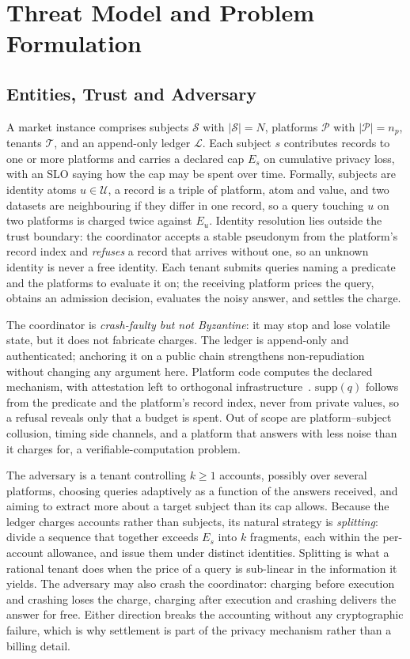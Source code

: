 \section{Threat Model and Problem Formulation}
\label{sec:model}

\subsection{Entities, Trust and Adversary}

A market instance comprises subjects $\mathcal{S}$ with $|\mathcal{S}|=N$,
platforms $\mathcal{P}$ with $|\mathcal{P}|=n_p$, tenants $\mathcal{T}$, and an
append-only ledger $\mathcal{L}$. Each subject $s$ contributes records to one or more platforms and carries a
declared cap $E_s$ on cumulative privacy loss, with an SLO saying how the cap may
be spent over time. Formally, subjects are identity atoms $u\in\mathcal{U}$, a record is
a triple of platform, atom and value, and two datasets are neighbouring if they differ in
one record, so a query touching $u$ on two platforms is charged twice against $E_u$.
Identity resolution lies outside the trust boundary: the coordinator accepts a stable
pseudonym from the platform's record index and \emph{refuses} a record that arrives
without one, so an unknown identity is never a free identity. Each tenant submits queries naming a predicate and the
platforms to evaluate it on; the receiving platform prices the query, obtains an
admission decision, evaluates the noisy answer, and settles the charge.

The coordinator is \emph{crash-faulty but not Byzantine}: it may stop and lose volatile
state, but it does not fabricate charges. The ledger is append-only and authenticated;
anchoring it on a public chain strengthens non-repudiation without changing any
argument here. Platform code computes the declared mechanism, with attestation left to
orthogonal infrastructure~\cite{liu2025yotta,zhu2025auditing}. $\mathrm{supp}(q)$ follows from the predicate and the platform's
record index, never from private values, so a refusal reveals only that a budget is
spent. Out of scope are platform--subject collusion, timing side channels, and a platform that
answers with less noise than it charges for, a verifiable-computation problem.

The adversary is a tenant controlling $k\ge1$ accounts, possibly over several
platforms, choosing queries adaptively as a function of the answers received, and
aiming to extract more about a target subject than its cap allows. Because the
ledger charges accounts rather than subjects, its natural strategy is
\emph{splitting}: divide a sequence that together exceeds $E_s$ into $k$ fragments,
each within the per-account allowance, and issue them under distinct identities.
Splitting is what a rational tenant does when the price of a query is sub-linear in
the information it yields. The adversary may also crash the coordinator: charging
before execution and crashing loses the charge, charging after execution and
crashing delivers the answer for free. Either direction breaks the accounting
without any cryptographic failure, which is why settlement is part of the privacy
mechanism rather than a billing detail.

